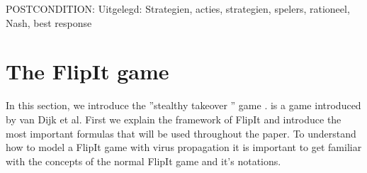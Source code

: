POSTCONDITION: Uitgelegd: Strategien, acties, strategien, spelers, rationeel, Nash, best response





\section{The FlipIt game}
\label{ch:FlipItGame}
In this section, we introduce the ''stealthy takeover '' game  \cite{FlipIt}.  is a game introduced by van Dijk et al. First we explain the framework of FlipIt and introduce the most important formulas that will be used throughout the paper. To understand how to model a FlipIt game with virus propagation it is important to get familiar with the concepts of the normal FlipIt game and it's notations.  \\

